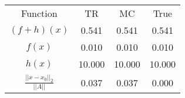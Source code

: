\begin{tabular}{| c |c |c |c |}
    \hline
    \rowcolor[gray]{0.9}
\multicolumn{4}{|c|}{Minima} \\ \hline Function & TR & MC & True \\
    \hline
  \rowcolor[gray]{0.7}
    $ (f + h)(x) $ & 0.541 & 0.541 & 0.541 \\
  \hline
  \rowcolor[gray]{0.8}
    $ f(x) $ & 0.010 & 0.010 & 0.010 \\
  \hline
  \rowcolor[gray]{0.7}
    $ h(x) $ & 10.000 & 10.000 & 10.000 \\
  \hline
  \rowcolor[gray]{0.8}
    $ \frac{||x - x_0||_2}{||A||} $ & 0.037 & 0.037 & 0.000 \\
  \hline
\end{tabular}
